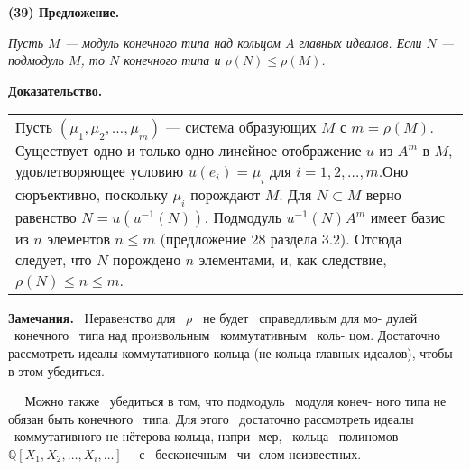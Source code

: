 	
	\noindent
	{\bf (39) Предложение.}
	
	{\it Пусть $M$ — модуль конечного типа над кольцом $A$ главных идеалов.\linebreak
	Если $N$ — подмодуль $M$, то $N$ конечного типа и $\rho(N) \leqslant \rho(M)$.}
	
	\noindent
	{\bf Доказательство.}
	
	\begin{tabular}{|p{12.5cm}}
	\noindent
	Пусть $(\mu_1, \mu_2, \ldots, \mu_m)$ — система образующих $M$ с $m = \rho(M)$.\linebreak
	Существует одно и только одно линейное отображение $u$ из $A^m$ в\linebreak
	$M$, удовлетворяющее условию $u(e_i) = \mu_i$ для $i = 1,2, \ldots ,m$.Оно\linebreak
	сюръективно, поскольку $\mu_i$ порождают $M$.\newline
	Для $N \subset M$ верно равенство $N = u(u^{-1}(N))$. Подмодуль $u^{-1}(N) A^m$\linebreak
	имеет базис из $n$ элементов $n \leqslant m$ (предложение 28 раздела 3.2).\linebreak
	Отсюда следует, что $N$ порождено $n$ элементами, и, как следствие,\linebreak
	$\rho(N) \leqslant n\leqslant m$.
	\end{tabular}
	
	\begin{flushleft}
		\hangindent=1cm  \noindent
		{\small {\bf Замечания.} \ Неравенство для \ $\rho$ \ не будет \ справедливым для мо-\linebreak
			дулей \ конечного \ типа над произвольным \ коммутативным \ коль-\linebreak
			цом. Достаточно рассмотреть идеалы коммутативного кольца (не\linebreak
			кольца главных идеалов), чтобы в этом убедиться.
			
			${\ \ \ \ \ \ }$Можно также \ убедиться в том, что подмодуль \ модуля конеч-\linebreak
			ного типа не обязан быть конечного \ типа. Для этого \ достаточно\linebreak
			рассмотреть идеалы \ коммутативного не нётерова кольца, напри-\linebreak
			мер, \ кольца \ полиномов \ \ $\mathbb Q[X_1, X_2, \ldots, X_i, \ldots]$ \ \ с \ бесконечным \ чи-\linebreak
			слом неизвестных.}
	\end{flushleft}
	
